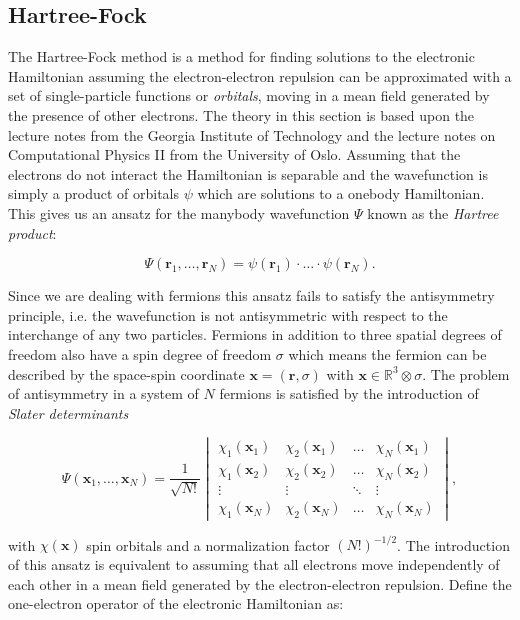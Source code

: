 \subsection{Hartree-Fock}
The Hartree-Fock method is a method for finding
solutions to the electronic Hamiltonian assuming
the electron-electron repulsion can be approximated
with a set of single-particle functions or \textit{orbitals},
moving in a mean field generated by the presence of other electrons.
The theory in this section is based upon the \parencite[Sherrill]
{sherrill2000} lecture notes from the Georgia Institute of Technology
and the lecture notes
on Computational Physics II \parencite[Hjorth-Jensen]
{hjensen2019} from the University of Oslo.
Assuming that the electrons do not interact
the Hamiltonian is separable and the wavefunction
is simply a product of orbitals $\psi$
which are solutions to a onebody Hamiltonian.
This gives us an ansatz for the manybody wavefunction $\Psi$
known as the \textit{Hartree product}:

\begin{equation}
 \Psi(\bm{r}_1,\dots,\bm{r}_N) = \psi(\bm{r}_1) \cdot \dots
    \cdot \psi(\bm{r}_N) . 
\end{equation}

Since we are dealing with fermions this ansatz fails to satisfy
the antisymmetry principle, i.e. the wavefunction
is not antisymmetric with respect to the interchange of any two
particles. Fermions in addition to three spatial degrees of freedom
also have a spin degree of freedom $\sigma$
which means the fermion can be described
by the space-spin coordinate $\bm{x} = (\bm{r}, \sigma)$
with $\bm{x} \in \mathbb{R}^3 \otimes \sigma$.
The problem of antisymmetry in a system of $N$ fermions
is satisfied by the introduction of \textit{Slater determinants}

\begin{equation}
\Psi(\bm{x}_1,\dots,\bm{x}_N)
= \frac{1}{\sqrt{N!}}
\begin{vmatrix}
    \chi_{1}(\bm{x}_1) & \chi_{2}(\bm{x}_1)
    & \dots & \chi_{N}(\bm{x}_1) \\
    \chi_{1}(\bm{x}_2)  & \chi_{2}(\bm{x}_2)
    & \dots & \chi_{N}(\bm{x}_2) \\
    \vdots & \vdots & \ddots & \vdots \\
    \chi_{1}(\bm{x}_N) & \chi_{2}(\bm{x}_N)
    & \dots & \chi_{N}(\bm{x}_N)
\end{vmatrix} ,
\end{equation}

with $\chi(\bm{x})$ spin orbitals and a normalization factor
$(N!)^{-1/2}$. The introduction of this ansatz is equivalent to assuming that
all electrons move independently of each other
in a mean field generated by the electron-electron repulsion.
Define the one-electron operator of the electronic Hamiltonian as:

